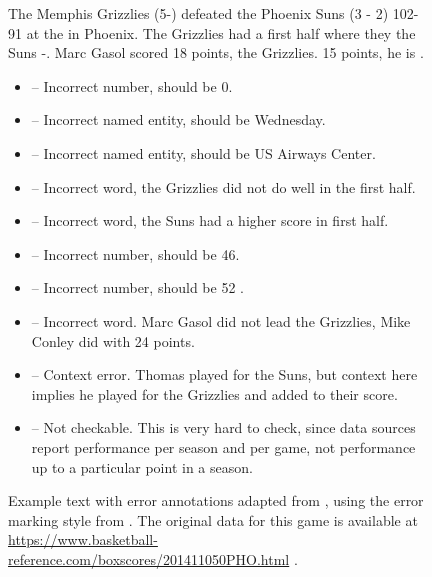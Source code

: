 \begin{figure}[t]
    \footnotesize
    \lineacross{}


    The Memphis Grizzlies (5-) defeated the Phoenix Suns (3 - 2)  102-91 at the  in Phoenix. The Grizzlies had a  first half where they  the Suns -. Marc Gasol scored 18 points,  the Grizzlies.   15 points, he is .
    \vspace{1mm}

    \begin{itemize}
        \item {}                                       -- Incorrect number, should be 0.
        \item {}                                  -- Incorrect named entity, should be Wednesday.
        \item {}              -- Incorrect named entity, should be US Airways Center.
        \item {}                                 -- Incorrect word, the Grizzlies did not do well in the first half.
        \item {}                             -- Incorrect word, the Suns had a higher score in first half.
        \item {}                                      -- Incorrect number, should be 46.
        \item {}                                      -- Incorrect number, should be 52 .
        \item {}                                -- Incorrect word.  Marc Gasol did not lead the Grizzlies, Mike Conley did with 24 points.
        \item {}                     -- Context error.  Thomas played for the Suns, but context here implies he played for the Grizzlies and added to their score.
        \item {} -- Not checkable.  This is very hard to check, since data sources report performance per season and per game, not performance up to a particular point in a season.
    \end{itemize}
    \lineacross{}

    \caption[An example text with error annotations.]{Example text with error annotations adapted from \citet{thomsonGenerationChallengesResults2021}, using the error marking style from \citet{thomsonEvaluatingFactualAccuracy2023}. The original data for this game is available at \url{https://www.basketball-reference.com/boxscores/201411050PHO.html} .}
    \label{fig:tok-eval:example}
\end{figure}
